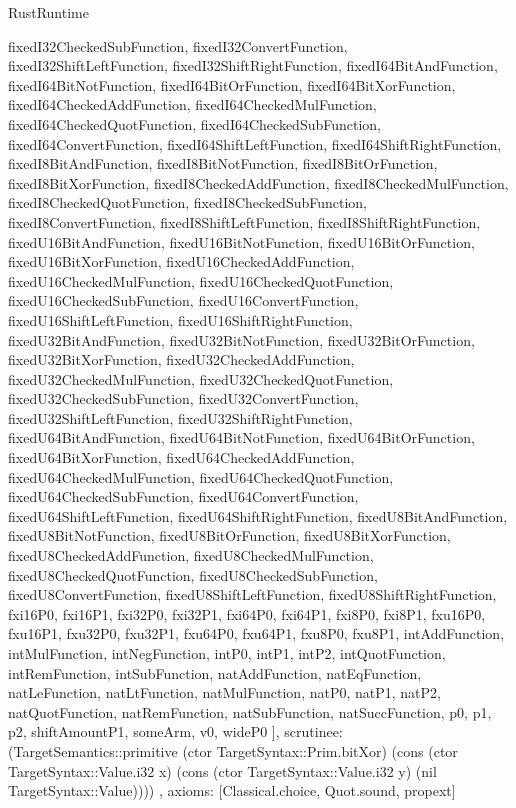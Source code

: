 \begin{lexlean}{RustRuntime}
\begin{semanticmodule}
{{      fixedI32CheckedSubFunction,
      fixedI32ConvertFunction,
      fixedI32ShiftLeftFunction,
      fixedI32ShiftRightFunction,
      fixedI64BitAndFunction,
      fixedI64BitNotFunction,
      fixedI64BitOrFunction,
      fixedI64BitXorFunction,
      fixedI64CheckedAddFunction,
      fixedI64CheckedMulFunction,
      fixedI64CheckedQuotFunction,
      fixedI64CheckedSubFunction,
      fixedI64ConvertFunction,
      fixedI64ShiftLeftFunction,
      fixedI64ShiftRightFunction,
      fixedI8BitAndFunction,
      fixedI8BitNotFunction,
      fixedI8BitOrFunction,
      fixedI8BitXorFunction,
      fixedI8CheckedAddFunction,
      fixedI8CheckedMulFunction,
      fixedI8CheckedQuotFunction,
      fixedI8CheckedSubFunction,
      fixedI8ConvertFunction,
      fixedI8ShiftLeftFunction,
      fixedI8ShiftRightFunction,
      fixedU16BitAndFunction,
      fixedU16BitNotFunction,
      fixedU16BitOrFunction,
      fixedU16BitXorFunction,
      fixedU16CheckedAddFunction,
      fixedU16CheckedMulFunction,
      fixedU16CheckedQuotFunction,
      fixedU16CheckedSubFunction,
      fixedU16ConvertFunction,
      fixedU16ShiftLeftFunction,
      fixedU16ShiftRightFunction,
      fixedU32BitAndFunction,
      fixedU32BitNotFunction,
      fixedU32BitOrFunction,
      fixedU32BitXorFunction,
      fixedU32CheckedAddFunction,
      fixedU32CheckedMulFunction,
      fixedU32CheckedQuotFunction,
      fixedU32CheckedSubFunction,
      fixedU32ConvertFunction,
      fixedU32ShiftLeftFunction,
      fixedU32ShiftRightFunction,
      fixedU64BitAndFunction,
      fixedU64BitNotFunction,
      fixedU64BitOrFunction,
      fixedU64BitXorFunction,
      fixedU64CheckedAddFunction,
      fixedU64CheckedMulFunction,
      fixedU64CheckedQuotFunction,
      fixedU64CheckedSubFunction,
      fixedU64ConvertFunction,
      fixedU64ShiftLeftFunction,
      fixedU64ShiftRightFunction,
      fixedU8BitAndFunction,
      fixedU8BitNotFunction,
      fixedU8BitOrFunction,
      fixedU8BitXorFunction,
      fixedU8CheckedAddFunction,
      fixedU8CheckedMulFunction,
      fixedU8CheckedQuotFunction,
      fixedU8CheckedSubFunction,
      fixedU8ConvertFunction,
      fixedU8ShiftLeftFunction,
      fixedU8ShiftRightFunction,
      fxi16P0,
      fxi16P1,
      fxi32P0,
      fxi32P1,
      fxi64P0,
      fxi64P1,
      fxi8P0,
      fxi8P1,
      fxu16P0,
      fxu16P1,
      fxu32P0,
      fxu32P1,
      fxu64P0,
      fxu64P1,
      fxu8P0,
      fxu8P1,
      intAddFunction,
      intMulFunction,
      intNegFunction,
      intP0,
      intP1,
      intP2,
      intQuotFunction,
      intRemFunction,
      intSubFunction,
      natAddFunction,
      natEqFunction,
      natLeFunction,
      natLtFunction,
      natMulFunction,
      natP0,
      natP1,
      natP2,
      natQuotFunction,
      natRemFunction,
      natSubFunction,
      natSuccFunction,
      p0,
      p1,
      p2,
      shiftAmountP1,
      someArm,
      v0,
      wideP0
    ],
    scrutinee: (TargetSemantics::primitive (ctor TargetSyntax::Prim.bitXor) (cons (ctor TargetSyntax::Value.i32 x) (cons (ctor TargetSyntax::Value.i32 y) (nil TargetSyntax::Value))))
  },
  axioms: [Classical.choice, Quot.sound, propext]
}


\end{semanticmodule}
\end{lexlean}
